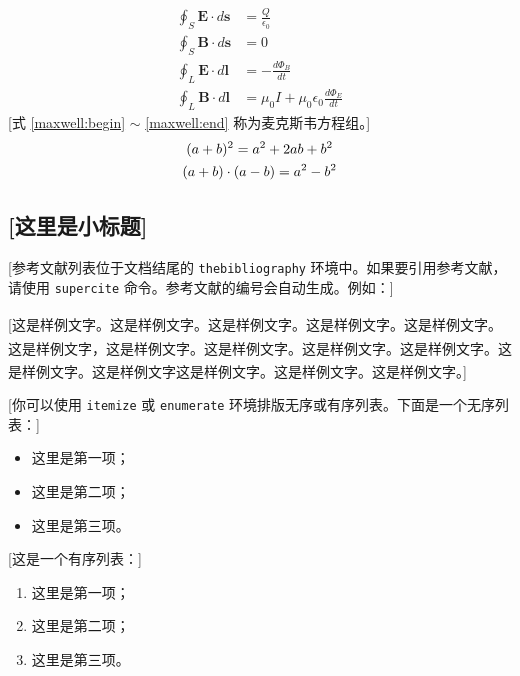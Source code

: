 \documentclass[a4paper,11pt,onecolumn,twoside]{article}
\newcommand{\supercite}[1]{\textsuperscript{\cite{#1}}}
\begin{document}
  \begin{align}
    \oint_S \mathbf{E} \cdot d \mathbf{s} &= \frac{Q}{\epsilon_0}
                                              \label{maxwell:begin} \\
    \oint_S \mathbf{B} \cdot d \mathbf{s} &= 0 \\
    \oint_L \mathbf{E} \cdot d \mathbf{l} &= -\frac{d\Phi_B}{dt} \\
    \oint_L \mathbf{B} \cdot d \mathbf{l} &= \mu_0 I +
               \mu_0 \epsilon_0 \frac{d\Phi_E}{dt} \label{maxwell:end}
  \end{align}
  [式 \ref{maxwell:begin} $\sim$ \ref{maxwell:end} 称为麦克斯韦方程组。]
  \begin{gather}
    (a + b)^2 = a^2 + 2ab + b^2      \notag   \\
    (a + b) \cdot (a - b) = a^2 - b^2
  \end{gather}


\subsection{[这里是小标题]}
[参考文献列表位于文档结尾的 \texttt{thebibliography} 环境中。如果要引用参考文献，请使用 \texttt{supercite} 命令。参考文献的编号会自动生成。例如：]

[这是样例文字。这是样例文字。这是样例文字\supercite{chendh, whiteside}。这是样例文字。这是样例文字。这是样例文字，\supercite{calms}这是样例文字。这是样例文字。这是样例文字。这是样例文字。这是样例文字。这是样例文字这是样例文字。这是样例文字。这是样例文字\supercite{obrien}。]

[你可以使用 \texttt{itemize} 或 \texttt{enumerate} 环境排版无序或有序列表。下面是一个无序列表：]
\begin{itemize}
    \item 这里是第一项；
    \item 这里是第二项；
    \item 这里是第三项。
\end{itemize}

[这是一个有序列表：]
\begin{enumerate}
    \item 这里是第一项；
    \item 这里是第二项；
    \item 这里是第三项。
\end{enumerate}
\end{document}
